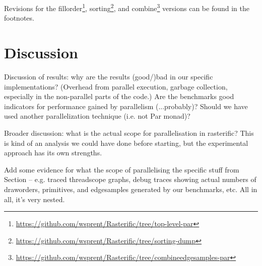 \documentclass[12pt, a4paper]{article}
\begin{document}
Revisions for the fillorder\footnote{\url{https://github.com/wsprent/Rasterific/tree/top-level-par}}, sorting\footnote{\url{https://github.com/wsprent/Rasterific/tree/sorting-dump}}, and combine\footnote{\url{https://github.com/wsprent/Rasterific/tree/combineedgesamples-par}} versions can be found in the footnotes.
\section{Discussion}\label{discussion}

Discussion of results: why are the results (good/)bad in our specific implementations? (Overhead from parallel execution, garbage collection, especially in the non-parallel parts of the code.)
Are the benchmarks good indicators for performance gained by parallelism (...probably)? Should we have used another parallelization technique (i.e. not Par monad)?

Broader discussion: what is the actual scope for parallelisation in rasterific? This is kind of an analysis we could have done before starting, but the experimental approach has its own strengths.

Add some evidence for what the scope of parallelising the specific stuff from Section \label{experiments} -- e.g. traced threadscope graphs, debug traces showing actual numbers of draworders, primitives, and edgesamples generated by our benchmarks, etc. All in all, it's very nested.
\end{document}
